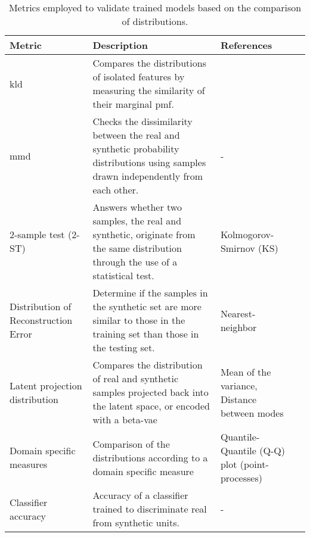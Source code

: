         \begin{table}[H]
        \footnotesize
            \caption{Metrics employed to validate trained models based on the comparison of distributions.\label{tab:distributions}} 
            \begin{tabularx}{\textwidth}{@{} p{} X  p{} @{}}\toprule
        
                Metric & Description & References\\\midrule
                
                \gls{kld} 
                & Compares the distributions of isolated features by measuring the similarity of their marginal \gls{pmf}. 
                & \cite{Goncalves2020}\\
                
                \gls{mmd} & 
                Checks the dissimilarity between the real and synthetic probability distributions using samples drawn independently from each other. & - &
                \cite{esteban2017real}\\
                
                2-sample test (2-ST) & Answers whether two samples, the real and synthetic, originate from the same distribution through the use of a statistical test. & 
                Kolmogorov-Smirnov (KS) & 
                \cite{Fisher2019,baowaly_2019_IEEE,baowaly_2019_jamia}\\
                
                Distribution of Reconstruction Error & 
                Determine if the samples in the synthetic set are more similar to those in the training set than those in the testing set. & Nearest-neighbor &
                \cite{esteban2017real}\\
                
                Latent projection distribution & 
                Compares the distribution of real and synthetic samples projected back into the latent space, or encoded with a \gls{beta-vae} & Mean of the variance, Distance between modes & \cite{Zhang2020} \\
                
                Domain specific measures & Comparison of the distributions according to a domain specific measure & Quantile-Quantile (Q-Q) plot (point-processes) & \cite{Xiao2017-lh}\\
                
                Classifier accuracy & Accuracy of a classifier trained to discriminate real from synthetic units. & - & \cite{Fisher2019,walsh2020generating}\\
                

\end{tabularx}
\end{table}
